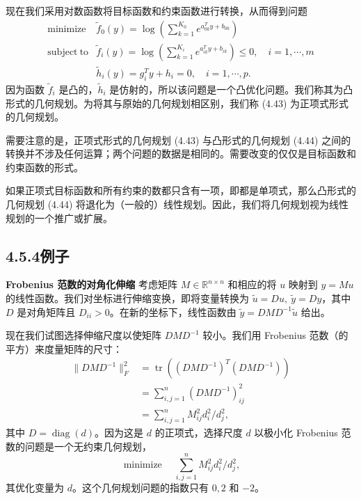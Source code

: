 \documentclass[UTF8,12pt,a4paper,fontset=fandol]{ctexart}
\begin{document}
现在我们采用对数函数将目标函数和约束函数进行转换，从而得到问题
\begin{equation}
\begin{array}{ll}
\mathop{\mathrm{minimize}} & \tilde f_0(y)=\log\left(\displaystyle\sum_{k=1}^{K_0}e^{a_{0k}^Ty+b_{0k}}\right)\\
\mathrm{subject\ to} & \tilde f_i(y)=\log\left(\displaystyle\sum_{k=1}^{K_i}e^{a_{ik}^Ty+b_{ik}}\right)\leq 0,\quad i=1,\cdots,m\\
& \tilde h_i(y)=g_i^Ty+h_i=0,\quad i=1,\cdots,p.
\end{array}
\tag{4.44}
\end{equation}
因为函数 $\tilde f_i$ 是凸的，$\tilde h_i$ 是仿射的，所以该问题是一个凸优化问题。我们称其为凸形式的几何规划。为将其与原始的几何规划相区别，我们称 (4.43) 为正项式形式的几何规划。

需要注意的是，正项式形式的几何规划 (4.43) 与凸形式的几何规划 (4.44) 之间的转换并不涉及任何运算；两个问题的数据是相同的。需要改变的仅仅是目标函数和约束函数的形式。

如果正项式目标函数和所有约束的数都只含有一项，即都是单项式，那么凸形式的几何规划 (4.44) 将退化为（一般的）线性规划。因此，我们将几何规划视为线性规划的一个推广或扩展。

\subsection*{4.5.4\quad 例子}

\noindent\textbf{Frobenius 范数的对角化伸缩}\quad
考虑矩阵 $M\in\mathbb{R}^{n\times n}$ 和相应的将 $u$ 映射到 $y=Mu$ 的线性函数。我们对坐标进行伸缩变换，即将变量转换为 $\tilde u=Du,\ \tilde y=Dy$，其中 $D$ 是对角矩阵且 $D_{ii}>0$。在新的坐标下，线性函数由 $\tilde y=DMD^{-1}\tilde u$ 给出。

现在我们试图选择伸缩尺度以使矩阵 $DMD^{-1}$ 较小。我们用 Frobenius 范数（的平方）来度量矩阵的尺寸：
\[
\begin{aligned}
\|DMD^{-1}\|_F^2
&=\operatorname{tr}\left((DMD^{-1})^T(DMD^{-1})\right)\\
&=\sum_{i,j=1}^n (DMD^{-1})_{ij}^2\\
&=\sum_{i,j=1}^n M_{ij}^2d_i^2/d_j^2,
\end{aligned}
\]
其中 $D=\operatorname{diag}(d)$。因为这是 $d$ 的正项式，选择尺度 $d$ 以极小化 Frobenius 范数的问题是一个无约束几何规划，
\[
\mathop{\mathrm{minimize}}\quad \sum_{i,j=1}^n M_{ij}^2d_i^2/d_j^2,
\]
其优化变量为 $d$。这个几何规划问题的指数只有 $0,2$ 和 $-2$。
\end{document}
